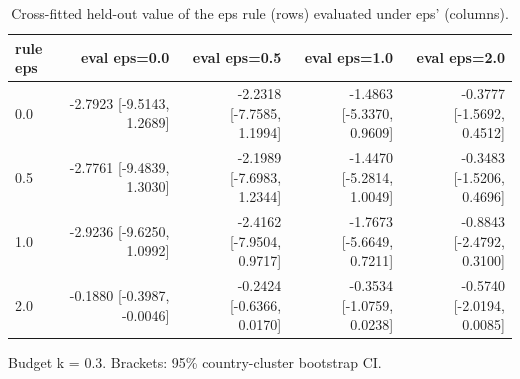 \begin{table}[htbp]
\centering
\caption{Cross-fitted held-out value of the eps rule (rows) evaluated under eps' (columns).}
\label{tab:policy_matrix}
\begin{tabular}{lrrrr}
\toprule
rule eps & eval eps=0.0 & eval eps=0.5 & eval eps=1.0 & eval eps=2.0 \\
\midrule
0.0 & -2.7923 [-9.5143, 1.2689] & -2.2318 [-7.7585, 1.1994] & -1.4863 [-5.3370, 0.9609] & -0.3777 [-1.5692, 0.4512] \\
0.5 & -2.7761 [-9.4839, 1.3030] & -2.1989 [-7.6983, 1.2344] & -1.4470 [-5.2814, 1.0049] & -0.3483 [-1.5206, 0.4696] \\
1.0 & -2.9236 [-9.6250, 1.0992] & -2.4162 [-7.9504, 0.9717] & -1.7673 [-5.6649, 0.7211] & -0.8843 [-2.4792, 0.3100] \\
2.0 & -0.1880 [-0.3987, -0.0046] & -0.2424 [-0.6366, 0.0170] & -0.3534 [-1.0759, 0.0238] & -0.5740 [-2.0194, 0.0085] \\
\bottomrule
\end{tabular}
\par\smallskip\footnotesize Budget k = 0.3. Brackets: 95\% country-cluster bootstrap CI.
\end{table}
